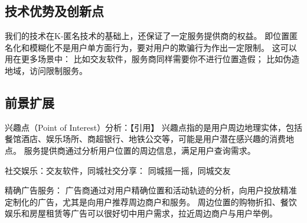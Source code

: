 \documentclass[zihao=-4]{ctexart}
\begin{document}
\subsection{技术优势及创新点}
我们的技术在K-匿名技术的基础上，还保证了一定服务提供商的权益。
即位置匿名化和模糊化不是用户单方面行为，要对用户的欺骗行为作出一定限制。
这可以用在更多场景中：
比如交友软件，服务商同样需要你不进行位置造假；
比如伪造地域，访问限制服务。

\subsection{前景扩展}
兴趣点（Point of Interest）分析：【引用】
兴趣点指的是用户周边地理实体，包括餐馆酒店、娱乐场所、商超银行、地铁公交等，可能是用户潜在感兴趣的消费地点。
服务提供商通过分析用户位置的周边信息，满足用户查询需求。

社交娱乐：交友软件，同城社交分享：
同城摇一摇，同城交友

精确广告服务：
广告商通过对用户精确位置和活动轨迹的分析，向用户投放精准定制化的广告，尤其是向用户推荐周边商户和服务。
周边位置的购物折扣、餐饮娱乐和房屋租赁等广告可以很好切中用户需求，拉近周边商户与用户举例。



\end{document}
